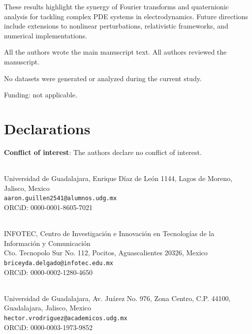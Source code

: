 \documentclass[12pt]{article}
\begin{document}
These results highlight the synergy of Fourier transforms and quaternionic analysis for tackling complex PDE systems in electrodynamics. Future directions include extensions to nonlinear perturbations, relativistic frameworks, and numerical implementations.


All the authors wrote the main manuscript text. All authors reviewed the manuscript.\\


No datasets were generated or analyzed during the current study.\\


Funding: not applicable.


\section*{Declarations}
{\bf Conflict of interest}: The authors declare no conflict of interest.
\printbibliography
\bigskip
\small{
\noindent {} \\
Universidad de Guadalajara, Enrique Díaz de León 1144, Lagos de Moreno, Jalisco, Mexico \\
\texttt{aaron.guillen2541@alumnos.udg.mx} \\
ORCiD: 0000-0001-8605-7021

\bigskip
\noindent {} \\
INFOTEC, Centro de Investigación e Innovación en Tecnologías de la Información y Comunicación \\
Cto. Tecnopolo Sur No. 112, Pocitos, Aguascalientes 20326, Mexico \\
\texttt{briceyda.delgado@infotec.edu.mx} \\
ORCiD: 0000-0002-1280-4650

\bigskip
\noindent {} \\
Universidad de Guadalajara, Av. Juárez No. 976, Zona Centro, C.P. 44100, Guadalajara, Jalisco, Mexico \\
\texttt{hector.vrodriguez@academicos.udg.mx} \\
ORCiD: 0000-0003-1973-9852
}
\end{document}
